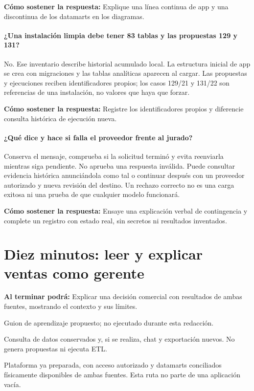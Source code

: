 \textbf{Cómo sostener la respuesta:} Explique una línea continua de app y una discontinua de los datamarts en los diagramas.

\paragraph{¿Una instalación limpia debe tener 83 tablas y las propuestas 129 y 131?} No. Ese inventario describe historial acumulado local. La estructura inicial de app se crea con migraciones y las tablas analíticas aparecen al cargar. Las propuestas y ejecuciones reciben identificadores propios; los casos 129/21 y 131/22 son referencias de una instalación, no valores que haya que forzar.

\textbf{Cómo sostener la respuesta:} Registre los identificadores propios y diferencie consulta histórica de ejecución nueva.

\paragraph{¿Qué dice y hace si falla el proveedor frente al jurado?} Conserva el mensaje, comprueba si la solicitud terminó y evita reenviarla mientras siga pendiente. No aprueba una respuesta inválida. Puede consultar evidencia histórica anunciándola como tal o continuar después con un proveedor autorizado y nueva revisión del destino. Un rechazo correcto no es una carga exitosa ni una prueba de que cualquier modelo funcionará.

\textbf{Cómo sostener la respuesta:} Ensaye una explicación verbal de contingencia y complete un registro con estado real, sin secretos ni resultados inventados.

\section{Diez minutos: leer y explicar ventas como gerente}
\textbf{Al terminar podrá:} Explicar una decisión comercial con resultados de ambas fuentes, mostrando el contexto y sus límites.

Guion de aprendizaje propuesto; no ejecutado durante esta redacción.

Consulta de datos conservados y, si se realiza, chat y exportación nuevos. No genera propuestas ni ejecuta ETL.

Plataforma ya preparada, con acceso autorizado y datamarts conciliados físicamente disponibles de ambas fuentes. Esta ruta no parte de una aplicación vacía.

